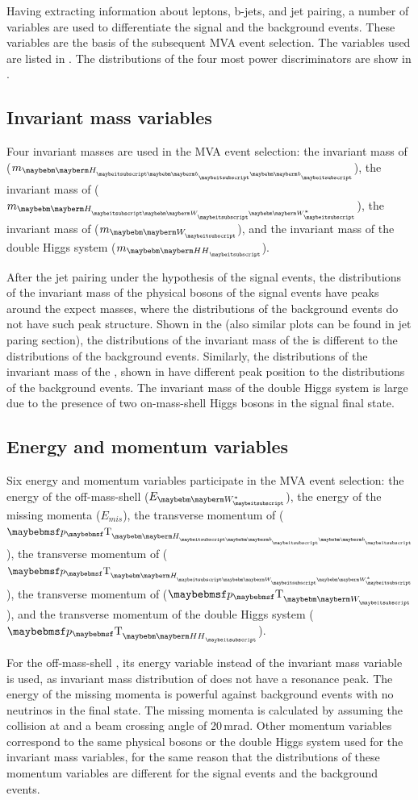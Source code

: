 Having extracting information about leptons, b-jets, and jet pairing, a number of variables are used to differentiate the signal and the background events. These variables are the basis of the subsequent MVA event selection. The variables used are listed in . The distributions of the four most power discriminators are show in .

\subsection{Invariant mass  variables}

Four invariant masses are used in the MVA event selection: the invariant mass of  \Hbb ($m_{\Hbb}$), the invariant mass of  \HWW ($m_{\HWW}$), the invariant mass of  \PW ($m_{\PW}$), and the invariant mass of the double Higgs system ($m_{\HH}$).

After the jet pairing under the hypothesis of the signal events, the distributions of the invariant mass of the physical bosons of the signal events have peaks around the expect masses, where the distributions of the  background events do not have such peak structure. Shown in the  (also similar plots can be found in jet paring section), the distributions of the invariant mass of the \Hbb is  different to the distributions of the background events. Similarly, the distributions of the invariant mass of the \HWW, shown in  have different peak position to the distributions of the background events.  The invariant mass of the double Higgs system is large due to the presence of two on-mass-shell Higgs bosons in the signal final state.

\subsection{Energy and momentum variables}

Six energy and momentum variables participate in the MVA event selection: the energy of the off-mass-shell \PW ($E_{\W*}$), the energy of the missing momenta ($E_{mis}$), the transverse momentum of \Hbb ($\pT_{\Hbb}$), the transverse momentum of \HWW ($\pT_{\HWW}$), the transverse momentum of \PW ($\pT_{\PW}$), and the transverse momentum of the double Higgs system ($\pT_{\HH}$).

For the off-mass-shell \PW, its energy variable instead of the invariant mass variable is used, as invariant mass distribution of \W* does not have a resonance peak. The energy of the missing momenta is powerful against background events with no neutrinos in the final state. The missing momenta is calculated by assuming the collision at \sqrtS and a beam crossing angle of 20\,mrad. Other momentum variables correspond to the same physical bosons or the double Higgs system used for  the invariant mass  variables, for the same reason that the distributions of these momentum variables are different for the signal events and the background events.


